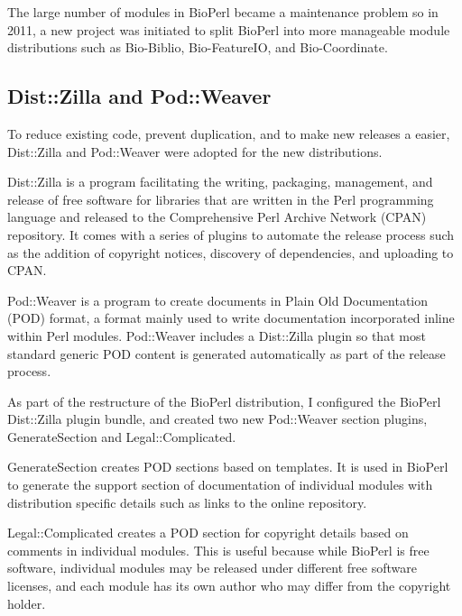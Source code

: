 The large number of modules in BioPerl became a maintenance problem
so in 2011, a new project was initiated to split BioPerl into
more manageable module distributions such as Bio-Biblio, Bio-FeatureIO, and
Bio-Coordinate.

\subsection{Dist::Zilla and Pod::Weaver}

To reduce existing code, prevent duplication,
and to make new releases
a easier, Dist::Zilla and Pod::Weaver were adopted for
the new distributions.

Dist::Zilla is a program facilitating the writing, packaging, management,
and release of free software for libraries that are written in the Perl
programming language and released to the Comprehensive Perl Archive
Network (CPAN) repository.  It comes with a series of plugins to automate the
release process such as the addition of copyright notices, discovery
of dependencies, and uploading to CPAN.

Pod::Weaver is a program to create documents in Plain Old
Documentation (POD) format, a format mainly used to write
documentation incorporated inline within Perl modules.
Pod::Weaver includes a Dist::Zilla plugin
so that most standard generic POD content is
generated automatically as part of the release process.

As part of the restructure of the BioPerl distribution, I configured
the BioPerl Dist::Zilla plugin bundle, and created two new Pod::Weaver
section plugins, GenerateSection and Legal::Complicated.

GenerateSection creates POD sections based on templates.  It is
used in BioPerl to generate the support section of documentation
of individual modules
with distribution specific details such as links to the online
repository.

Legal::Complicated creates a POD section for copyright details
based on comments in individual modules.  This is useful because while
BioPerl is free
software, individual modules may be released under different free
software licenses, and each module has its own author who may
differ from the copyright holder.

